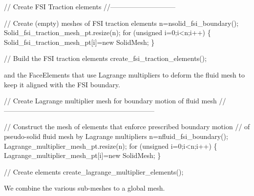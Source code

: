 \begin{DoxyCodeInclude}


\textcolor{comment}{// Create FSI Traction elements}
\textcolor{comment}{//-----------------------------}
 
\textcolor{comment}{// Create (empty) meshes of FSI traction elements}
 n=nsolid\_fsi\_boundary();
 Solid\_fsi\_traction\_mesh\_pt.resize(n);
 \textcolor{keywordflow}{for} (\textcolor{keywordtype}{unsigned} i=0;i<n;i++)
  \{
   Solid\_fsi\_traction\_mesh\_pt[i]=\textcolor{keyword}{new} SolidMesh;
  \}
 
 \textcolor{comment}{// Build the FSI traction elements}
 create\_fsi\_traction\_elements();

\end{DoxyCodeInclude}


and the {\ttfamily Face\+Elements} that use Lagrange multipliers to deform the fluid mesh to keep it aligned with the F\+SI boundary.


\begin{DoxyCodeInclude}
 
 
 \textcolor{comment}{// Create Lagrange multiplier mesh for boundary motion of fluid mesh}
 \textcolor{comment}{//------------------------------------------------------------------}
  
 \textcolor{comment}{// Construct the mesh of elements that enforce prescribed boundary motion}
 \textcolor{comment}{// of pseudo-solid fluid mesh by Lagrange multipliers}
 n=nfluid\_fsi\_boundary();
 Lagrange\_multiplier\_mesh\_pt.resize(n);
 \textcolor{keywordflow}{for} (\textcolor{keywordtype}{unsigned} i=0;i<n;i++)
  \{
   Lagrange\_multiplier\_mesh\_pt[i]=\textcolor{keyword}{new} SolidMesh;
  \}
 
 \textcolor{comment}{// Create elements}
 create\_lagrange\_multiplier\_elements();

\end{DoxyCodeInclude}


We combine the various sub-\/meshes to a global mesh.


